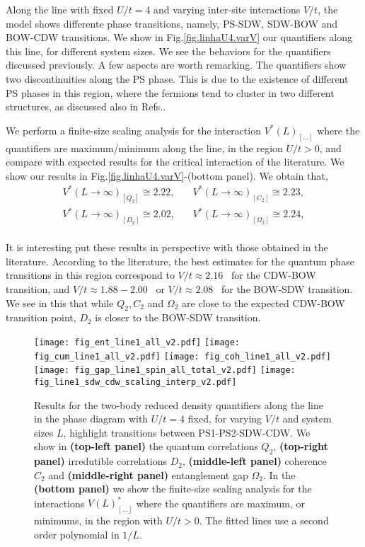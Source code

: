 \documentclass[prb,reprint,showpacs,twocolumn,superscriptaddress]{revtex4-2}
\begin{document}
Along the line with fixed $U/t = 4$ and varying inter-site interactions $V/t$, the model shows differente phase transitions, namely, PS-SDW, SDW-BOW and  BOW-CDW transitions. We show in Fig.\eqref{fig.linhaU4.varV} our quantifiers along this line, for different system sizes. We see the behaviors for the quantifiers discussed previously. A few aspects are worth remarking. The quantifiers show two discontinuities along the PS phase. This is due to the existence of different PS phases in this region, where the fermions tend to cluster in two different structures, as discussed also in Refs.\cite{lin00,Deng2006}.

We perform a finite-size scaling analysis for the interaction $V^*(L)_{[...]}$ where the quantifiers are maximum/minimum along the line, in the region $U/t>0$, and compare with expected results for the critical interaction of the literature. We show our results in Fig.\eqref{fig.linhaU4.varV}-(bottom panel). We obtain that,
\begin{eqnarray}
 V^*(L \rightarrow \infty)_{[Q_2]} \cong 2.22,&\,& 
 V^*(L \rightarrow \infty)_{[C_2]} \cong  2.23, \nonumber \\
 V^*(L \rightarrow \infty)_{[D_2]} \cong  2.02,&\,& 
 V^*(L \rightarrow \infty)_{[\Omega_2]} \cong  2.24,\nonumber \\
 & &
\end{eqnarray}

It is interesting put these results in perspective with those obtained in the literature. According to the literature, the best estimates for the quantum phase transitions in this region correspond to $V/t \approx 2.16$~\cite{sengupta02,zhang04,jeckelmann02,ejima07,sandvik04}   for the CDW-BOW transition, and  $V/t \approx 1.88-2.00$~\cite{sengupta02,zhang04,ejima07,sandvik04} or  $V/t \approx 2.08$~\cite{dalmonte14} for the BOW-SDW transition. We see in this that while $Q_2, C_2$ and $\Omega_2$ are close to the expected CDW-BOW transition point, $D_2$ is closer to the BOW-SDW transition.

\begin{figure*}
\texttt{[image: fig\_ent\_line1\_all\_v2.pdf]}
\texttt{[image: fig\_cum\_line1\_all\_v2.pdf]}
\texttt{[image: fig\_coh\_line1\_all\_v2.pdf]}
\texttt{[image: fig\_gap\_line1\_spin\_all\_total\_v2.pdf]}
\texttt{[image: fig\_line1\_sdw\_cdw\_scaling\_interp\_v2.pdf]}
\caption{
Results for the two-body reduced density quantifiers along the line in the phase diagram with $U/t=4$ fixed, for varying $V/t$ and system sizes $L$, highlight transitions between PS1-PS2-SDW-CDW. 
We show in \textbf{(top-left panel)} the quantum correlations $Q_2$, \textbf{(top-right panel)} irredutible correlations $D_2$, 
\textbf{(middle-left panel)} coherence $C_2$ and  
\textbf{(middle-right panel)} entanglement gap $\Omega_2$. In the 
\textbf{(bottom panel)} we show the finite-size scaling analysis for the interactions $V(L)^*_{[...]}$ where the quantifiers are maximum, or minimums, in the region with $U/t > 0$. The fitted lines use a second order polynomial in $1/L$.
}
\label{fig.linhaU4.varV}
\end{figure*}
\end{document}

